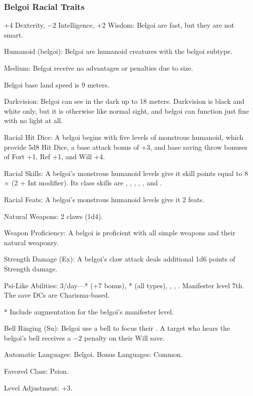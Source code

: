\subsubsection{Belgoi Racial Traits}
\begin{itemize*}
	\item +4 Dexterity, $-2$ Intelligence, +2 Wisdom: Belgoi are fast, but they are not smart.
    \item Humanoid (belgoi): Belgoi are humanoid creatures with the belgoi subtype.
	\item Medium: Belgoi receive no advantages or penalties due to size.
    \item Belgoi base land speed is 9 meters.
    \item Darkvision: Belgoi can see in the dark up to 18 meters. Darkvision is black and white only, but it is otherwise like normal sight, and belgoi can function just fine with no light at all.
    \item Racial Hit Dice: A belgoi begins with five levels of monstrous humanoid, which provide 5d8 Hit Dice, a base attack bonus of +3, and base saving throw bonuses of Fort +1, Ref +1, and Will +4.
    \item Racial Skills: A belgoi's monstrous humanoid levels give it skill points equal to 8 $\times$ (2 + Int modifier). Its class skills are , , , , , and .
    \item Racial Feats: A belgoi's monstrous humanoid levels give it 2 feats.
    \item Natural Weapons: 2 claws (1d4).
    \item Weapon Proficiency: A belgoi is proficient with all simple weapons and their natural weaponry.
    \item Strength Damage (Ex): A belgoi's claw attack deals additional 1d6 points of Strength damage.
    \item Psi-Like Abilities: 3/day---* (+7 bonus), * (all types), , , . Manifester level 7th. The save DCs are Charisma-based.

    * Include augmentation for the belgoi's manifester level.
    \item Bell Ringing (Su): Belgoi use a bell to focus their . A  target who hears the belgoi's bell receives a $-2$ penalty on their Will save.
    \item Automatic Languages: Belgoi. Bonus Languages: Common.
    \item Favored Class: Psion.
    \item Level Adjustment: +3.
\end{itemize*}
